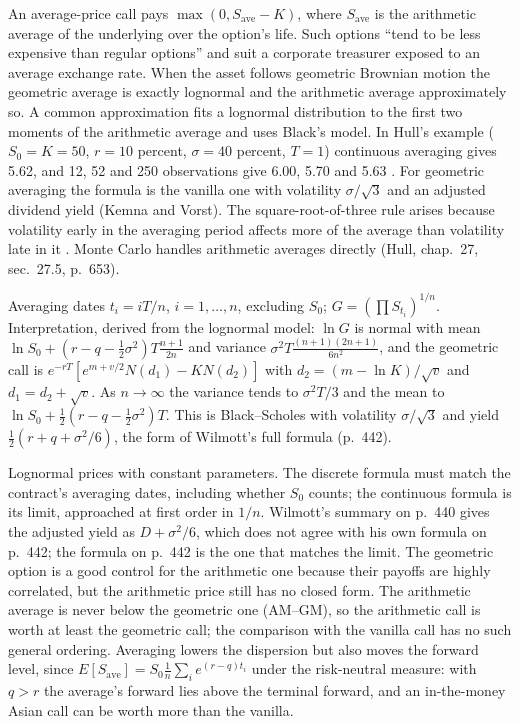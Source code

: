 \begin{qfmethod}\label{meth:asian-option-valuation}
 An average-price call pays $\max(0,S_{\text{ave}}-K)$, where $S_{\text{ave}}$ is the arithmetic average of the underlying over the option's life. Such options ``tend to be less expensive than regular options'' and suit a corporate treasurer exposed to an average exchange rate. When the asset follows geometric Brownian motion the geometric average is exactly lognormal and the arithmetic average approximately so. A common approximation fits a lognormal distribution to the first two moments of the arithmetic average and uses Black's model. In Hull's example ($S_0=K=50$, $r=10$ percent, $\sigma=40$ percent, $T=1$) continuous averaging gives 5.62, and 12, 52 and 250 observations give 6.00, 5.70 and 5.63 \citep[chap.~26, sec.~26.13, pp.~626--627]{s7-hulloptions}. For geometric averaging the formula is the vanilla one with volatility $\sigma/\sqrt3$ and an adjusted dividend yield (Kemna and Vorst). The square-root-of-three rule arises because volatility early in the averaging period affects more of the average than volatility late in it \citep[chap.~25, secs.~25.9--25.11, pp.~440--442]{wide-wilmott-pwoqf}. Monte Carlo handles arithmetic averages directly (Hull, chap.~27, sec.~27.5, p.~653).

 Averaging dates $t_i=iT/n$, $i=1,\dots,n$, excluding $S_0$; $G=(\prod S_{t_i})^{1/n}$. Interpretation, derived from the lognormal model: $\ln G$ is normal with mean $\ln S_0+(r-q-\tfrac12\sigma^2)T\frac{n+1}{2n}$ and variance $\sigma^2T\frac{(n+1)(2n+1)}{6n^2}$, and the geometric call is $e^{-rT}[e^{m+v/2}N(d_1)-KN(d_2)]$ with $d_2=(m-\ln K)/\sqrt v$ and $d_1=d_2+\sqrt v$. As $n\to\infty$ the variance tends to $\sigma^2T/3$ and the mean to $\ln S_0+\tfrac12(r-q-\tfrac12\sigma^2)T$. This is Black--Scholes with volatility $\sigma/\sqrt3$ and yield $\tfrac12(r+q+\sigma^2/6)$, the form of Wilmott's full formula (p.~442).

 Lognormal prices with constant parameters. The discrete formula must match the contract's averaging dates, including whether $S_0$ counts; the continuous formula is its limit, approached at first order in $1/n$. Wilmott's summary on p.~440 gives the adjusted yield as $D+\sigma^2/6$, which does not agree with his own formula on p.~442; the formula on p.~442 is the one that matches the limit. The geometric option is a good control for the arithmetic one because their payoffs are highly correlated, but the arithmetic price still has no closed form. The arithmetic average is never below the geometric one (AM--GM), so the arithmetic call is worth at least the geometric call; the comparison with the vanilla call has no such general ordering. Averaging lowers the dispersion but also moves the forward level, since $E[S_{\text{ave}}]=S_0\frac1n\sum_ie^{(r-q)t_i}$ under the risk-neutral measure: with $q>r$ the average's forward lies above the terminal forward, and an in-the-money Asian call can be worth more than the vanilla.


\end{qfmethod}
